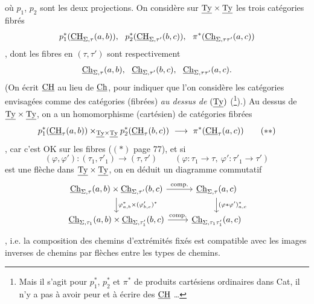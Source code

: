 où $p_1$, $p_2$ sont les deux projections. On considère sur $\underline{\mathrm{Ty}}\times\underline{\mathrm{Ty}}$ les trois catégories fibrés %
\[
p_1^*(\CH_{\Sigma,\tau}(a,b)),\ \ p_2^*(\CH_{\Sigma,\tau'}(b,c)),\ \ \pi^*(\Ch_{\Sigma,\tau\tau'}(a,c))
\]
, dont les fibres en $(\tau,\tau')$ sont respectivement %
\[
\Ch_{\Sigma,\tau}(a,b),\ \ \Ch_{\Sigma,\tau'}(b,c),\ \ \Ch_{\Sigma,\tau\tau'}(a,c).
\]
(On écrit $\underline{\mathrm{CH}}$ au lieu de $\underline{\mathrm{Ch}}$, pour indiquer que l'on considère les catégories envisagées comme des catégories (fibrées) \textit{au dessus de} $(\underline{\mathrm{Ty}})$ (\footnote{Mais il s'agit pour $p_1^*$, $p_2^*$ et $\pi^*$ de produits cartésiens ordinaires dans Cat, il n'y a pas à avoir peur et à écrire des $\underline{\mathrm{CH}}$ \ldots}).) Au dessus de $\underline{\mathrm{Ty}}\times\underline{\mathrm{Ty}}$, on a un homomorphisme (cartésien) de catégories fibrées
\[
p_1^*(\CH_{\tau}(a,b))\times_{\Ty\times\Ty} p_2^*(\CH_{\tau}(b,c)) \ \longrightarrow\ \pi^*(\CH_{\tau}(a,c)) \tag*{$(**)$}
\]
,
car c'est OK sur les fibres ($(*)$ page 77), et si
\[
(\varphi,\varphi') : (\tau_1,\tau'_1) \longrightarrow (\tau,\tau') \qquad (\varphi : \tau_1 \longrightarrow \tau,\ \varphi' : \tau'_1 \longrightarrow \tau')
\]
est une flèche dans $\underline{\mathrm{Ty}}\times\underline{\mathrm{Ty}}$, on en déduit un diagramme commutatif
\[
\begin{tikzcd}
\Ch_{\Sigma,\tau}(a,b)\times\Ch_{\Sigma,\tau'}(b,c) \ar[r,"\text{comp.}"] \ar[d,"\varphi^*_{a,b}\times(\varphi'_{b,c})^*"] & \Ch_{\Sigma,\tau}(a,c) \ar[d,"(\varphi*\varphi')^*_{a,c}"] \\
\Ch_{\Sigma,\tau_1}(a,b)\times\Ch_{\Sigma,\tau'_1}(b,c) \ar[r,"\text{comp.}"] & \Ch_{\Sigma,\tau_1\tau'_1}(a,c)
\end{tikzcd}
\]
, i.e. la composition des chemins d'extrémités fixés est compatible avec les images inverses de chemins par flèches entre les types de chemins.


